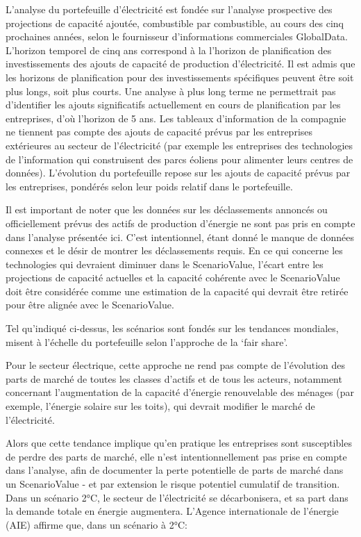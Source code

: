 \documentclass[10pt,table,a4]{article}\usepackage[]{graphicx}\usepackage[]{color}
\begin{document}
	
	\begin{multicols}{2}
		
		{\small L'analyse du portefeuille d'électricité est fondée sur l'analyse prospective des projections de capacité ajoutée, combustible par combustible, au cours des cinq prochaines années, selon le fournisseur d'informations commerciales GlobalData. L'horizon temporel de cinq ans correspond à la l'horizon de planification des investissements des ajouts de capacité de production d'électricité. Il est admis que les horizons de planification pour des investissements spécifiques peuvent être soit plus longs, soit plus courts. Une analyse à plus long terme ne permettrait pas d'identifier les ajouts significatifs actuellement en cours de planification par les entreprises, d'où l'horizon de 5 ans. Les tableaux d'information de la compagnie ne tiennent pas compte des ajouts de capacité prévus par les entreprises extérieures au secteur de l'électricité (par exemple les entreprises des technologies de l'information qui construisent des parcs éoliens pour alimenter leurs centres de données). L'évolution du portefeuille repose sur les ajouts de capacité prévus par les entreprises, pondérés selon leur poids relatif dans le portefeuille.
		 
		 
		Il est important de noter que les données sur les déclassements annoncés ou officiellement prévus des actifs de production d’énergie ne sont pas pris en compte dans l'analyse présentée ici. C'est intentionnel, étant donné le manque de données connexes et le désir de montrer les déclassements requis. En ce qui concerne les technologies qui devraient diminuer dans le ScenarioValue, l'écart entre les projections de capacité actuelles et la capacité cohérente avec le ScenarioValue doit être considérée comme une estimation de la capacité qui devrait être retirée pour être alignée avec le ScenarioValue.
		
		
	Tel qu'indiqué ci-dessus, les scénarios sont fondés sur les tendances mondiales, misent à l'échelle du portefeuille selon l'approche de la ‘fair share’. 
	
		
		Pour le secteur électrique, cette approche ne rend pas compte de l’évolution des parts de marché  de toutes les classes d'actifs et de tous les acteurs, notamment concernant l'augmentation de la capacité d'énergie renouvelable des ménages (par exemple, l'énergie solaire sur les toits), qui devrait modifier le marché de l'électricité.
		
		Alors que cette tendance implique qu'en pratique les entreprises sont susceptibles de perdre des parts de marché, elle n'est intentionnellement pas prise en compte dans l'analyse, afin de documenter la perte potentielle de parts de marché dans un ScenarioValue - et par extension le risque potentiel cumulatif de transition. Dans un scénario 2°C, le secteur de l'électricité se décarbonisera, et sa part dans la demande totale en énergie augmentera. L'Agence internationale de l'énergie (AIE) affirme que, dans un scénario à 2°C:
		
}
\end{multicols}
\end{document}

